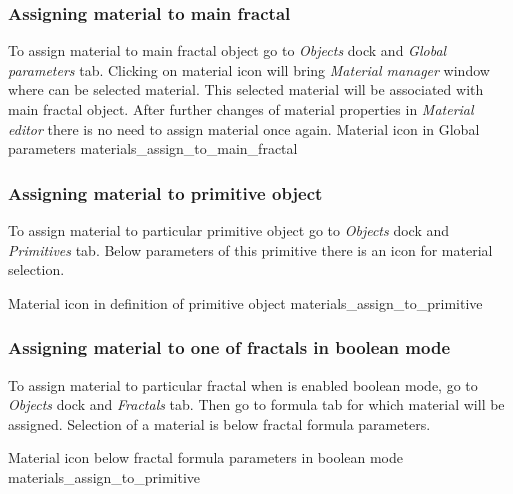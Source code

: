 \subsubsection{Assigning material to main fractal}\label{assigning-material-to-main-fractal}

To assign material to main fractal object go to \emph{Objects} dock and \emph{Global parameters} tab. Clicking on material icon will bring \emph{Material manager} window where can be selected material. This selected material will be associated with main fractal object. After further changes of material properties in \emph{Material editor} there is no need to assign material once again.
\nopagebreak
{}
{Material icon in Global parameters}
{materials_assign_to_main_fractal}

\subsubsection{Assigning material to primitive object}\label{assigning-material-to-primitive}

To assign material to particular primitive object go to \emph{Objects} dock and \emph{Primitives} tab. Below parameters of this primitive there is an icon for material selection.
 
\nopagebreak
{}
{Material icon in definition of primitive object}
{materials_assign_to_primitive}

\subsubsection{Assigning material to one of fractals in boolean mode}\label{assigning-material-to-boolean}

To assign material to particular fractal when is enabled boolean mode, go to \emph{Objects} dock and \emph{Fractals} tab. Then go to formula tab for which material will be assigned. Selection of a material is below fractal formula parameters.

\nopagebreak
{}
{Material icon below fractal formula parameters in boolean mode}
{materials_assign_to_primitive}

